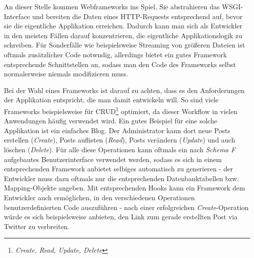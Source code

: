 An dieser Stelle kommen Webframeworks ins Spiel. Sie abstrahieren das WSGI-Interface und bereiten
die Daten eines HTTP-Requests entsprechend auf, bevor sie die eigentliche Applikation erreichen.
Dadurch kann man sich als Entwickler in den meisten Fällen darauf konzentrieren, die eigentliche
Applikationslogik zu schreiben. Für Sonderfälle wie beispielsweise Streaming von größeren Dateien
ist oftmals zusätzlicher Code notwndig, allerdings bietet ein gutes Framework entsprechende
Schnittstellen an, sodass man den Code des Frameworks selbst normalerweise niemals modifizieren
muss.

Bei der Wahl eines Frameworks ist darauf zu achten, dass es den Anforderungen der Applikation
entspricht, die man damit entwickeln will. So sind viele Frameworks beispielsweise für
CRUD\footnote{\emph{Create, Read, Update, Delete}} optimiert, da dieser Workflow in vielen
Anwendungen häufig verwendet wird. Ein gutes Beispiel für eine solche Applikation ist ein einfaches
Blog. Der Administrator kann dort neue Posts erstellen (\emph{Create}), Posts auflisten
(\emph{Read}), Posts verändern (\emph{Update}) und auch löschen (\emph{Delete}). Für alle diese
Operationen kann oftmals ein nach \emph{Schema F} aufgebautes Benutzerinterface verwendet werden,
sodass es sich in einem entsprechenden Framework anbietet selbiges automatisch zu generieren - der
Entwickler muss dazu oftmals nur die entsprechenden Datenbanktabellen bzw. Mapping-Objekte angeben.
Mit entsprechenden Hooks kann ein Framework dem Entwickler auch ermöglichen, in den verschiedenen
Operationen benutzerdefinierten Code auszuführen - nach einer erfolgreichen \emph{Create}-Operation
würde es sich beispielsweise anbieten, den Link zum gerade erstellten Post via Twitter zu
verbreiten.
